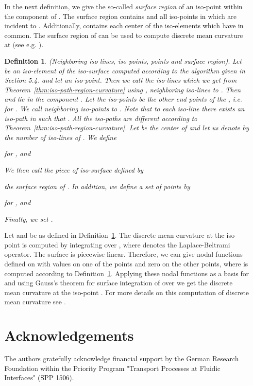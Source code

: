 \documentclass[a4paper,11pt]{article}
\newtheorem{definition}[theorem]{Definition}
\begin{document}
In the next definition, we give the so-called {\it surface region}  of an iso-point  within the
component  of . The surface region  contains  and all iso-points in 
which are incident to . Additionally,  contains each center of the iso-elements which have  in
common. The surface region  of  can be used to compute discrete mean curvature at 
(see e.g. \cite{Meyer02Vismath}).

\begin{definition}(Neighboring iso-lines, iso-points, points and surface region). Let  be an
iso-element of the iso-surface  computed according to the algorithm given in Section 5.4.
and let  an iso-point. Then we call the iso-lines  which we get from
Theorem~\ref{thm:iso-path-region-curvature} using , neighboring iso-lines to . Then
 and  lie in the component . Let the iso-points  be
the other end points of the , i.e.  for .
We call  neighboring iso-points to . Note that to each iso-line  there exists an
iso-path  in  such that . All the iso-paths
 are different according to Theorem~\ref{thm:iso-path-region-curvature}.
Let  be the center of  and let us denote by  the number of iso-lines
of . We define

for , and

We then call the piece of iso-surface  defined by

the surface region of . In addition, we define a set of points
 by

for , and

Finally, we set .
\label{def:neighboring-points-1}
\end{definition}

Let  and  be as defined in
Definition~\ref{def:neighboring-points-1}. The discrete mean curvature at the iso-point  is computed by
integrating  over , where  denotes the
Laplace-Beltrami operator. The surface  is piecewise linear. Therefore, we can give
nodal functions defined on  with values  on one of the points 
and zero on the other points, where  is computed according to
Definition~\ref{def:neighboring-points-1}. Applying these nodal functions as a basis for 
and using Gauss's theorem for surface integration of  over  we get
the discrete mean curvature at the iso-point . For more details on this computation of discrete mean curvature
see \cite{Meyer02Vismath}.




\section*{Acknowledgements}
The authors gratefully acknowledge financial support by the German Research Foundation within the
Priority Program "Transport Processes at Fluidic Interfaces" (SPP 1506).
\newpage


\end{document}

